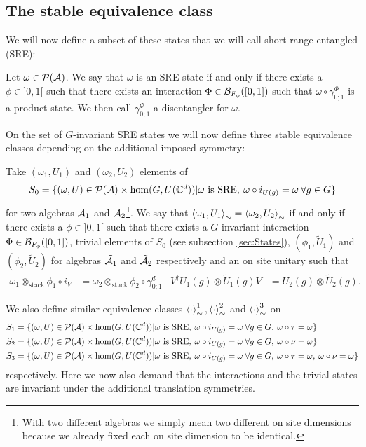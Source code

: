 \documentclass[12pt,a4paper,twoside]{article}
\numberwithin{equation}{section}
\begin{document}
\subsection{The stable equivalence class}\label{sec:StableEquivalenceClasses}
We will now define a subset of these states that we will call short range entangled (SRE):
\begin{definition}\label{def:sre}
	Let $\omega\in\PP(\AA)$. We say that $\omega$ is an SRE state if and only if there exists a $\phi\in]0,1[$ such that there exists an interaction $\Phi\in\BB_{F_\phi}([0,1])$ such that $\omega\circ\gamma^\Phi_{0;1}$ is a product state. We then call $\gamma^\Phi_{0;1}$ a disentangler for $\omega$.
\end{definition}
On the set of $G$-invariant SRE states we will now define three stable equivalence classes depending on the additional imposed symmetry:
\begin{definition}
	Take $(\omega_1,U_1)$ and $(\omega_2,U_2)$ elements of
	\begin{equation}
		S_0=\{(\omega,U)\in\PP(\AA)\times\hom(G,U(\CC^d))|\omega\text{ is SRE},\:\omega\circ i_{U(g)}=\omega\:\forall g\in G\}
	\end{equation}
	for two algebras $\AA_1$ and $\AA_2$\footnote{With two different algebras we simply mean two different on site dimensions because we already fixed each on site dimension to be identical.}. We say that $\expval{\omega_1,U_1}_\sim=\expval{\omega_2,U_2}_\sim$ if and only if there exists a $\phi\in]0,1[$ such that there exists a $G$-invariant interaction $\Phi\in\BB_{F_\phi}([0,1])$, trivial elements of $S_0$ (see subsection \ref{sec:States}), $(\phi_1,\tilde U_1)$ and $(\phi_2,\tilde U_2)$ for algebras $\tilde\AA_1$ and $\tilde\AA_2$ respectively and an on site unitary such that
	\begin{align}
		\omega_1\otimes_{\text{stack}}\phi_1\circ i_V&=\omega_2\otimes_{\text{stack}}\phi_2\circ\gamma^\Phi_{0;1}&V^\dagger U_{1}(g)\otimes \tilde{U}_{1}(g)V&=U_{2}(g)\otimes \tilde{U}_{2}(g).
	\end{align}
\end{definition}
We also define similar equivalence classes $\expval{\cdot}_\sim^1,\expval{\cdot}_\sim^2$ and $\expval{\cdot}_\sim^3$ on
\begin{align}
	S_1&=\{(\omega,U)\in\PP(\AA)\times\hom(G,U(\CC^d))|\omega\text{ is SRE},\:\omega\circ i_{U(g)}=\omega\:\forall g\in G,\:\omega\circ\tau=\omega\}\\
	S_2&=\{(\omega,U)\in\PP(\AA)\times\hom(G,U(\CC^d))|\omega\text{ is SRE},\:\omega\circ i_{U(g)}=\omega\:\forall g\in G,\:\omega\circ\nu=\omega\}\\
	S_3&=\{(\omega,U)\in\PP(\AA)\times\hom(G,U(\CC^d))|\omega\text{ is SRE},\:\omega\circ i_{U(g)}=\omega\:\forall g\in G,\:\omega\circ\tau=\omega,\:\omega\circ\nu=\omega\}
\end{align}
respectively. Here we now also demand that the interactions and the trivial states are invariant under the additional translation symmetries.
\end{document}
